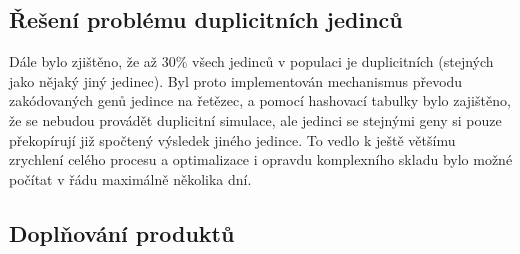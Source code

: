 \subsection{Řešení problému duplicitních jedinců}
\label{section:sim_duplicit_jedinci}
Dále bylo zjištěno, že až $30\%$ všech jedinců v populaci je duplicitních (stejných jako nějaký jiný jedinec). Byl proto implementován mechanismus převodu zakódovaných genů jedince na řetězec, a pomocí hashovací tabulky bylo zajištěno, že se nebudou provádět duplicitní simulace, ale jedinci se stejnými geny si pouze překopírují již spočtený výsledek jiného jedince. To vedlo k ještě většímu zrychlení celého procesu a optimalizace i opravdu komplexního skladu bylo možné počítat v řádu maximálně několika dní.

\subsection{Doplňování produktů}
\label{replenishment}




